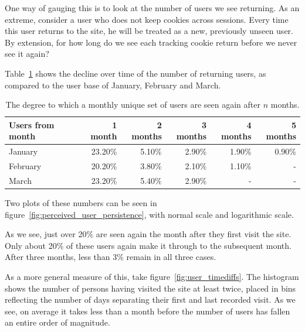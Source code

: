 One way of gauging this is to look at the number of users we see returning. As an extreme, consider a user who does not keep cookies across sessions. Every time this user returns to the site, he will be treated as a new, previously unseen user. By extension, for how long do we see each tracking cookie return before we never see it again?

Table~\ref{tab:returning_users} shows the decline over time of the number of returning users, as compared to the user base of January, February and March.

\begin{table}[h]
  \centering
  \begin{tabular}{|l|rrrrr|}
    \hline
    Users from month & 1 month & 2 months & 3 months & 4 months & 5 months \\ \hline
    January          & 23.20\% & 5.10\%   & 2.90\%   & 1.90\%   & 0.90\%   \\
    February         & 20.20\% & 3.80\%   & 2.10\%   & 1.10\%   & -        \\
    March            & 23.20\% & 5.40\%   & 2.90\%   & -        & -        \\ \hline
  \end{tabular}
  \caption{The degree to which a monthly unique set of users are seen again after $n$ months.}
  \label{tab:returning_users}
\end{table}

Two plots of these numbers can be seen in figure~\ref{fig:perceived_user_persistence}, with normal scale and logarithmic scale.

As we see, just over 20\% are seen again the month after they first visit the site. Only about 20\% of these users again make it through to the subsequent month. After three months, less than 3\% remain in all three cases.

As a more general measure of this, take figure~\ref{fig:user_timediffs}. The histogram shows the number of persons having visited the site at least twice, placed in bins reflecting the number of days separating their first and last recorded visit. As we see, on average it takes less than a month before the number of users has fallen an entire order of magnitude.

